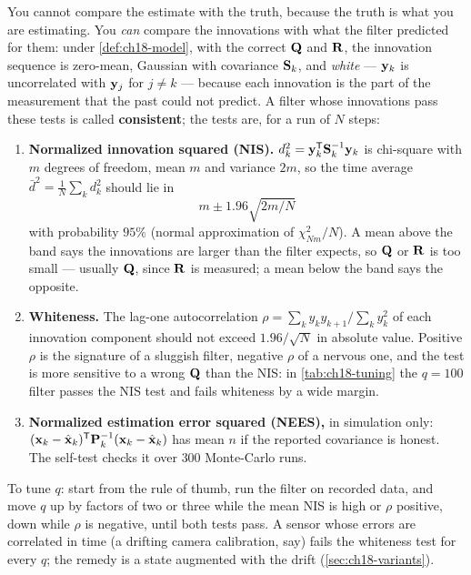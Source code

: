 You cannot compare the estimate with the truth, because the truth is what
you are estimating. You \emph{can} compare the innovations with what the
filter predicted for them: under \cref{def:ch18-model}, with the correct
$\mathbf{Q}$ and $\mathbf{R}$, the innovation sequence is zero-mean, Gaussian with
covariance $\mathbf{S}_k$, and \emph{white} --- $\mathbf{y}_k$ is uncorrelated
with $\mathbf{y}_j$ for $j\ne k$ --- because each innovation is the part of
the measurement that the past could not predict. A filter whose innovations
pass these tests is called \textbf{consistent};
the tests are, for a run of $N$ steps:
\begin{enumerate}
  \item \textbf{Normalized innovation squared (NIS).}
  $d^2_k=\mathbf{y}_k^{\mathsf{T}}\mathbf{S}_k^{-1}\mathbf{y}_k$ is chi-square with $m$ degrees
  of freedom, mean $m$ and variance $2m$, so the time average
  $\bar d^2=\frac1N\sum_k d^2_k$ should lie in
  \begin{equation}
    m\pm1.96\sqrt{2m/N}
    \label{eq:ch18-nis-band}
  \end{equation}
  with probability $95\%$ (normal approximation of $\chi^2_{Nm}/N$). A mean
  above the band says the innovations are larger than the filter expects, so
  $\mathbf{Q}$ or $\mathbf{R}$ is too small --- usually $\mathbf{Q}$, since $\mathbf{R}$
  is measured; a mean below the band says the opposite.
  \item \textbf{Whiteness.} The lag-one autocorrelation
  $\rho=\sum_k y_ky_{k+1}/\sum_k y_k^2$ of each innovation component should
  not exceed $1.96/\sqrt N$ in absolute value. Positive $\rho$ is the
  signature of a sluggish filter, negative $\rho$ of a nervous one, and the
  test is more sensitive to a wrong $\mathbf{Q}$ than the NIS: in
  \cref{tab:ch18-tuning} the $q=100$ filter passes the NIS test and fails
  whiteness by a wide margin.
  \item \textbf{Normalized estimation error squared (NEES),} in
  simulation only: $(\mathbf{x}_k-\hat{\mathbf{x}}_k)^{\mathsf{T}}\mathbf{P}_k^{-1}(\mathbf{x}_k-\hat{\mathbf{x}}_k)$
  has mean $n$ if the reported covariance is honest. The self-test checks it
  over $300$ Monte-Carlo runs.
\end{enumerate}
To tune $q$: start from the rule of thumb, run the filter on recorded data,
and move $q$ up by factors of two or three while the mean NIS is high or
$\rho$ positive, down while $\rho$ is negative, until both tests pass. A
sensor whose errors are correlated in time (a drifting camera calibration,
say) fails the whiteness test for every $q$; the remedy is a state augmented
with the drift (\cref{sec:ch18-variants}).

